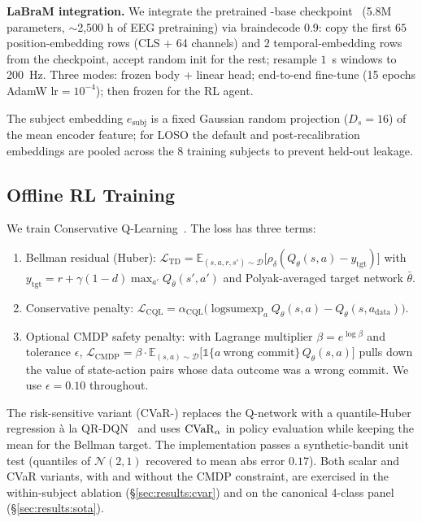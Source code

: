 \textbf{LaBraM integration.} We integrate the pretrained
\labram{}-base checkpoint~\cite{LaBraM2024} (5.8M parameters,
$\sim$2{,}500 h of EEG pretraining) via braindecode 0.9: copy the
first $65$ position-embedding rows (CLS + 64 channels) and $2$
temporal-embedding rows from the checkpoint, accept random init
for the rest; resample $1$~s windows to 200~Hz. Three modes:
frozen body + linear head; end-to-end fine-tune (15 epochs AdamW
$\text{lr}\!=\!10^{-4}$); then frozen for the RL agent.

The subject embedding $e_{\text{subj}}$ is a fixed Gaussian random
projection ($D_s\!=\!16$) of the mean encoder feature; for LOSO
the default and post-recalibration embeddings are pooled across
the 8 training subjects to prevent held-out leakage.

\subsection{Offline RL Training}\label{sec:methods:rl}

We train Conservative Q-Learning~\cite{Kumar2020CQL}. The loss has three
terms:
\begin{enumerate}
\item Bellman residual (Huber):
$\mathcal{L}_{\text{TD}} = \mathbb{E}_{(s,a,r,s') \sim \mathcal{D}}\big[\rho_\delta(Q_\theta(s,a) - y_{\text{tgt}})\big]$
with $y_{\text{tgt}} = r + \gamma (1-d) \max_{a'} Q_{\bar\theta}(s', a')$
and Polyak-averaged target network $\bar\theta$.
\item Conservative penalty:
$\mathcal{L}_{\text{CQL}} = \alpha_{\text{CQL}}\big(\operatorname{logsumexp}_a Q_\theta(s,a) - Q_\theta(s,a_{\text{data}})\big)$.
\item Optional CMDP safety penalty: with Lagrange multiplier
$\beta = e^{\log\beta}$ and tolerance $\epsilon$,
$\mathcal{L}_{\text{CMDP}} = \beta \cdot \mathbb{E}_{(s,a)\sim \mathcal{D}}\big[\mathbb{1}\{a~\text{wrong commit}\}\, Q_\theta(s, a)\big]$
pulls down the value of state-action pairs whose data outcome was a
wrong commit. We use $\epsilon = 0.10$ throughout.
\end{enumerate}

The risk-sensitive variant (CVaR-\cql{}) replaces the Q-network with a
quantile-Huber regression à la QR-DQN~\cite{Dabney2018QR-DQN} and uses
$\mathrm{CVaR}_\alpha$ in policy evaluation while keeping the mean for the
Bellman target. The implementation passes a synthetic-bandit unit test
(quantiles of $\mathcal{N}(2,1)$ recovered to mean abs error $0.17$).
Both scalar and CVaR variants, with and without the CMDP constraint,
are exercised in the within-subject ablation
(\S\ref{sec:results:cvar}) and on the canonical \bcia{} 4-class panel
(\S\ref{sec:results:sota}).


